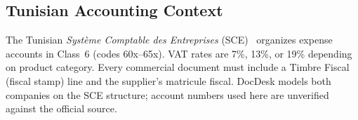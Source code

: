 \subsection{Tunisian Accounting Context}

The Tunisian \textit{Système Comptable des Entreprises} (SCE)~\cite{sce1997}
organizes expense accounts in Class~6 (codes 60x–65x). VAT rates are 7\%,
13\%, or 19\% depending on product category. Every commercial document must
include a Timbre Fiscal (fiscal stamp) line and the supplier's matricule fiscal.
DocDesk models both companies on the SCE structure; account numbers used here
are unverified against the official source.

